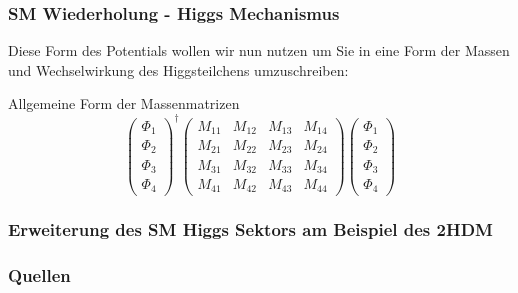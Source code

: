 \documentclass{beamer}
\begin{document}
\begin{frame}
\frametitle{SM Wiederholung - Higgs Mechanismus }
Diese Form des Potentials wollen wir nun nutzen um Sie in eine Form der Massen und Wechselwirkung des Higgsteilchens umzuschreiben:
\begin{block}{Allgemeine Form der Massenmatrizen}
\begin{equation}
\left( \begin{array}{c} \Phi_{1}\\ \Phi_{2} \\ \Phi_{3} \\ \Phi_{4} \end{array}\right)^{\dagger} \left( \begin{array}{rrr} M_{11}&M_{12}&M_{13}&M_{14}\\M_{21}&M_{22}&M_{23}&M_{24} \\ M_{31}&M_{32}&M_{33}&M_{34}\\ M_{41}&M_{42}&M_{43}&M_{44}\end{array}\right) \left( \begin{array}{c} \Phi_{1}\\ \Phi_{2} \\ \Phi_{3} \\ \Phi_{4} \end{array}\right)
\end{equation}
\end{block}
\end{frame} 






\begin{frame}
\frametitle{Erweiterung des SM Higgs Sektors am Beispiel des 2HDM}
\end{frame}
\begin{frame} 
\frametitle{Quellen}
\printbibliography
\end{frame}

 
\end{document}
